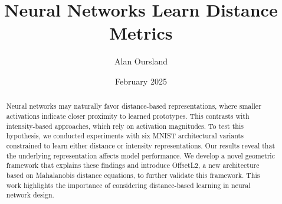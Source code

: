 \documentclass[11pt]{article}
\title{Neural Networks Learn Distance Metrics}
\author{Alan Oursland}
\affil{\textit{alan.oursland@gmail.com}}
\date{February 2025}
\begin{document}
\maketitle

\begin{abstract}
    Neural networks may naturally favor distance-based representations, where smaller activations indicate closer proximity to learned prototypes. This contrasts with intensity-based approaches, which rely on activation magnitudes. To test this hypothesis, we conducted experiments with six MNIST architectural variants constrained to learn either distance or intensity representations. Our results reveal that the underlying representation affects model performance. We develop a novel geometric framework that explains these findings and introduce OffsetL2, a new architecture based on Mahalanobis distance equations, to further validate this framework. This work highlights the importance of considering distance-based learning in neural network design.
\end{abstract}
    










\end{document}
